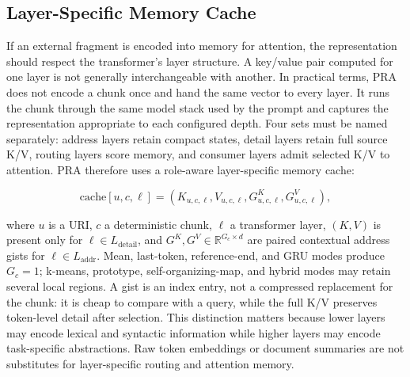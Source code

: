 \documentclass[11pt]{article}
\begin{document}
\subsection{Layer-Specific Memory Cache}

If an external fragment is encoded into memory for attention, the representation should respect the transformer's layer structure. A key/value pair computed for one layer is not generally interchangeable with another.  In practical terms, PRA does not encode a
chunk once and hand the same vector to every layer.  It runs the chunk through the same
model stack used by the prompt and captures the representation appropriate to each configured
depth.  Four sets must be named separately: address layers retain compact states, detail layers
retain full source K/V, routing layers score memory, and consumer layers admit selected K/V to
attention.  PRA therefore uses a role-aware layer-specific memory cache:

\begin{equation}
\mathrm{cache}[u,c,\ell] = (K_{u,c,\ell}, V_{u,c,\ell}, G^K_{u,c,\ell},G^V_{u,c,\ell}),
\end{equation}

where $u$ is a URI, $c$ a deterministic chunk, $\ell$ a transformer layer, $(K,V)$ is present only
for $\ell\in L_{\mathrm{detail}}$, and $G^K,G^V\in\mathbb{R}^{G_c\times d}$ are paired contextual
address gists for $\ell\in L_{\mathrm{addr}}$.  Mean, last-token, reference-end, and GRU modes produce $G_c=1$; k-means, prototype, self-organizing-map, and hybrid modes may retain several local regions.  A gist is an index entry, not a compressed replacement for the
chunk: it is cheap to compare with a query, while the full K/V preserves token-level
detail after selection. This distinction matters because lower layers may encode lexical and syntactic information while higher layers may encode task-specific abstractions. Raw token embeddings or document summaries are not substitutes for layer-specific routing and attention memory.
\end{document}
